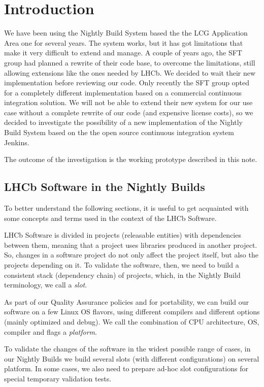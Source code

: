 
\section{Introduction}
\label{sec:Introduction}

We have been using the Nightly Build System based the the LCG Application Area
one for several years\cite{Kruzelecki:2010zz}.  The system works, but it has got
limitations that make it very difficult to extend and manage.  A couple of years
ago, the SFT group had planned a rewrite of their code base, to overcome the
limitations, still allowing extensions like the ones needed by LHCb.  We decided to
wait their new implementation before reviewing our code.  Only recently the SFT
group opted for a completely different implementation based on a commercial
continuous integration solution.  We will not be able to extend their new system
for our use case without a complete rewrite of our code (and expensive license
costs), so we decided to investigate the possibility of a new implementation of
the Nightly Build System based on the the open source continuous integration
system Jenkins\cite{Jenkins}.

The outcome of the investigation is the working prototype described in this
note.

\subsection{LHCb Software in the Nightly Builds}
To better understand the following sections, it is useful to get acquainted with
some concepts and terms used in the context of the LHCb Software.

LHCb Software is divided in projects (releasable entities) with dependencies
between them, meaning that a project uses libraries produced in another project.
So, changes in a software project do not only affect the project itself, but
also the projects depending on it.  To validate the software, then, we need to
build a consistent stack (dependency chain) of projects, which, in the Nightly
Build terminology, we call a \emph{slot}.

As part of our Quality Assurance policies and for portability, we can build our
software on a few Linux OS flavors, using different compilers and different
options (mainly optimized and debug).  We call the combination of CPU
architecture, OS, compiler and flags a \emph{platform}.

To validate the changes of the software in the widest possible range of cases,
in our Nightly Builds we build several slots (with different configurations) on
several platform.  In some cases, we also need to prepare ad-hoc slot
configurations for special temporary validation tests.
